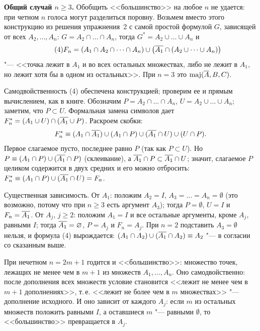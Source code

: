 \begin{solution}[4 (\S\,3)]
\textbf{Общий случай $n\ge3$.} Обобщить <<большинство>> на любое $n$
не удается: при четном $n$ голоса могут разделиться поровну. Возьмем
вместо этого конструкцию из решения упражнения~2 с самой простой формулой
$G$, зависящей от всех $A_2,\dots,A_n$: $G=A_2\cap\dots\cap A_n$, тогда
$G^*=A_2\cup\dots\cup A_n$ и
\begin{equation*}\tag{4}
F_n=(A_1\cap A_2\cap\dots\cap A_n)\cup\bigl(\overline{A_1}\cap(A_2\cup\dots\cup A_n)\bigr)
\end{equation*}
"--- <<точка лежит в $A_1$ и во всех остальных множествах, либо не лежит
в $A_1$, но лежит хотя бы в одном из остальных>>. При $n=3$ это
$\operatorname{maj}(\overline{A},B,C)$.

Самодвойственность (4) обеспечена конструкцией; проверим ее и прямым
вычислением, как в книге. Обозначим $P=A_2\cap\dots\cap A_n$,
$U=A_2\cup\dots\cup A_n$; заметим, что $P\subset U$. Формальная замена
символов дает $F_n^*=(A_1\cup U)\cap(\overline{A_1}\cup P)$. Раскроем скобки:
\[
F_n^*\equiv(A_1\cap\overline{A_1})\cup(A_1\cap P)\cup(\overline{A_1}\cap U)\cup(U\cap P).
\]
Первое слагаемое пусто, последнее равно $P$ (так как $P\subset U$).
Но $P\equiv(A_1\cap P)\cup(\overline{A_1}\cap P)$ (склеивание), а
$\overline{A_1}\cap P\subset\overline{A_1}\cap U$; значит, слагаемое $P$ целиком
содержится в двух средних и его можно отбросить:
$F_n^*\equiv(A_1\cap P)\cup(\overline{A_1}\cap U)=F_n$.

Существенная зависимость. От $A_1$: положим $A_2=I$, $A_3=\dots=A_n=
\emptyset$ (это возможно, потому что при $n\ge3$ есть аргумент $A_3$);
тогда $P=\emptyset$, $U=I$ и $F_n=\overline{A_1}$. От $A_j$, $j\ge2$: положим
$A_1=I$ и все остальные аргументы, кроме $A_j$, равными $I$; тогда
$\overline{A_1}=\varnothing$, $P=A_j$ и $F_n=A_j$. При $n=2$ подставить
$A_3=\emptyset$ нельзя, и формула (4) вырождается:
$(A_1\cap A_2)\cup(\overline{A_1}\cap A_2)\equiv A_2$ "--- в согласии со
сказанным выше.

При нечетном $n=2m+1$ годится и <<большинство>>: множество точек, лежащих
не менее чем в $m+1$ из множеств $A_1,\dots,A_n$. Оно самодвойственно:
после дополнения всех множеств условие становится <<лежит не менее чем в
$m+1$ дополнениях>>, т.\,е. <<лежит не более чем в $m$ множествах>> "---
дополнение исходного. И оно зависит от каждого $A_j$: если $m$ из
остальных множеств положить равными $I$, а оставшиеся $m$ "--- равными
$\emptyset$, то <<большинство>> превращается в $A_j$.


\end{solution}
